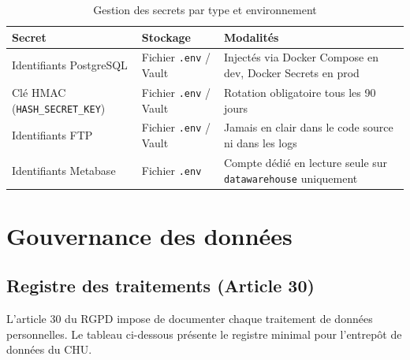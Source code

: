 \documentclass[12pt, a4paper]{report}
\begin{document}
\begin{itemize}[label=\textcolor{chuBlue}{\textbullet}]
\begin{table}[htbp]
\centering\footnotesize\renewcommand{\arraystretch}{1.5}
\begin{tabularx}{\linewidth}{@{} L{3.5cm} L{3.0cm} X @{}}
\toprule
{}
\textbf{Secret} & \textbf{Stockage} & \textbf{Modalités} \\
\midrule
Identifiants PostgreSQL &
Fichier \texttt{.env} / Vault &
Injectés via Docker Compose en dev, Docker Secrets en prod \\
Clé HMAC (\texttt{HASH\_SECRET\_KEY}) &
Fichier \texttt{.env} / Vault &
Rotation obligatoire tous les 90 jours \\
Identifiants FTP &
Fichier \texttt{.env} / Vault &
Jamais en clair dans le code source ni dans les logs \\
Identifiants Metabase &
Fichier \texttt{.env} &
Compte dédié en lecture seule sur \texttt{datawarehouse} uniquement \\
\bottomrule
\end{tabularx}
\caption{Gestion des secrets par type et environnement}
\label{tab:secrets}
\end{table}

\clearpage

\section{Gouvernance des données}
\label{sec:registre-traitements}

\subsection{Registre des traitements (Article 30)}
\label{sec:registre-art30}

L'article 30 du RGPD impose de documenter chaque traitement de données personnelles. Le tableau ci-dessous présente le registre minimal pour l'entrepôt de données du CHU.


\end{itemize}
\end{document}
